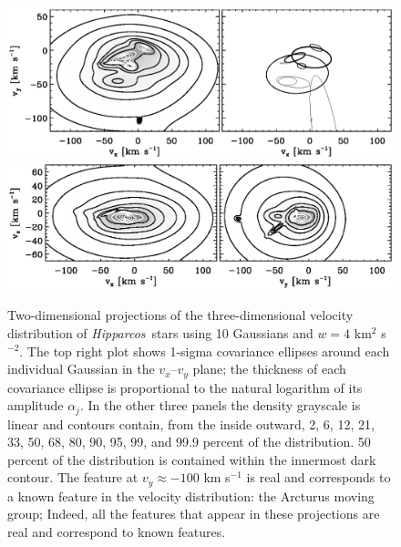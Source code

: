 \documentclass[aoas,preprint,authoryear,round]{imsart}
\newcommand{\Hipparcos}{\emph{Hipparcos}}
\begin{document}
\clearpage
\begin{figure}
\centering
\includegraphics[width=\textwidth]{4veldist1.ps}\\
\includegraphics[width=\textwidth]{4veldist2.ps}
\caption{Two-dimensional projections of the three-dimensional velocity
distribution of \Hipparcos\ stars using 10 Gaussians and $w = 4$
km$^2$ s$^{-2}$. The top right plot shows 1-sigma covariance ellipses
around each individual Gaussian in the $v_x$--$v_y$ plane; the
thickness of each covariance ellipse is proportional to the natural
logarithm of its amplitude $\alpha_j$. In the other three panels the
density grayscale is linear and contours contain, from the inside
outward, 2, 6, 12, 21, 33, 50, 68, 80, 90, 95, 99, and 99.9 percent of
the distribution. 50 percent of the distribution is contained within
the innermost dark contour. The feature at $v_y \approx -100$ km
s$^{-1}$ is real and corresponds to a known feature in the velocity
distribution: the Arcturus moving group; Indeed, all the features that
appear in these projections are real and correspond to known
features.}\label{fig:4veldist}
\end{figure}
\end{document}
